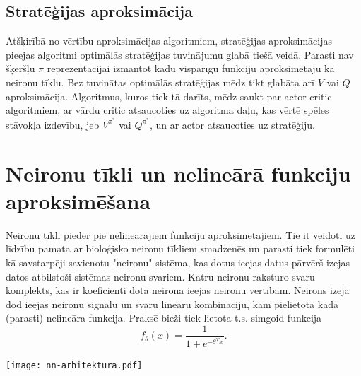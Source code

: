 \documentclass[a0,landscape]{a0poster}
\numberwithin{equation}{section}
\theoremstyle{definition}
\theoremstyle{plain}
\begin{document}
\begin{multicols}{5}
\subsection*{Stratēģijas aproksimācija}
Atšķirībā no vērtību aproksimācijas algoritmiem, stratēģijas aproksimācijas pieejas algoritmi optimālās stratēģijas tuvinājumu glabā tiešā veidā.
Parasti nav šķēršļu $\pi$ reprezentācijai izmantot kādu vispārīgu funkciju aproksimētāju kā neironu tīklu.
Bez tuvinātas optimālās stratēģijas mēdz tikt glabāta arī $V$ vai $Q$ aproksimācija.
Algoritmus, kuros tiek tā darīts, mēdz saukt par actor-critic algoritmiem, ar vārdu critic atsaucoties uz algoritma daļu, kas vērtē spēles stāvokļa izdevību, jeb $V^{\pi^*}$ vai $Q^{\pi^*}$, un ar actor atsaucoties uz stratēģiju.



\section*{Neironu tīkli un nelineārā funkciju aproksimēšana}
Neironu tīkli pieder pie nelineārajiem funkciju aproksimētājiem.
Tie it veidoti uz līdzību pamata ar bioloģisko neironu tīkliem smadzenēs un parasti tiek formulēti kā savstarpēji savienotu "neironu" sistēma, kas dotus ieejas datus pārvērš izejas datos atbilstoši sistēmas neironu svariem.
Katru neironu raksturo svaru komplekts, kas ir koeficienti dotā neirona ieejas neironu vērtībām.
Neirons izejā dod ieejas neironu signālu un svaru lineāru kombināciju, kam pielietota kāda (parasti) nelineāra funkcija.
Praksē bieži tiek lietota t.s. simgoid funkcija
\[
	f_\theta(x) = \frac{1}{1 + e^{-\theta^T x}}.
\]


\begin{center}\vspace{1cm}
\texttt{[image: nn-arhitektura.pdf]}
\end{center}\vspace{1cm}


\end{multicols}
\end{document}
